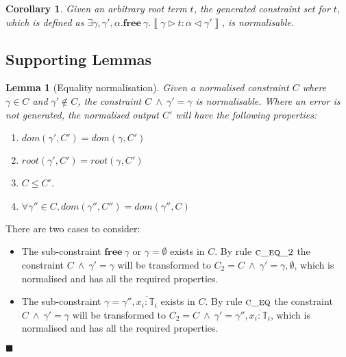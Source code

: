 \documentclass[preprint]{sigplanconf}
\newtheorem{lem}{Lemma}
\newtheorem{cor}{Corollary}
\newcommand{\inferlhs}[1]{\left\llbracket \gamma \triangleright #1 : \alpha \triangleleft \gamma' \right\rrbracket}
\newcommand{\cand}{\:\wedge\:}
\newcommand{\free}[1]{\mathbf{free}\:#1}
\newcommand{\tinf}{\mathbb{T}}
\newcommand{\qed}{$\blacksquare$}
\newenvironment{proof}{\vspace{1ex}\noindent{\bf Proof}\hspace{0.5em}}
  {\hfill\qed\vspace{1ex}}
\begin{document}
\begin{cor}
Given an arbitrary root term $t$, the generated constraint set for $t$,
which is defined as
$\exists \gamma, \gamma', \alpha . \free{\gamma} . \inferlhs{t}$,
is normalisable.
\end{cor}

\subsection{Supporting Lemmas}

\begin{lem}[Equality normalisation]
\label{lem:norm_eq}
Given a normalised constraint $C$ where $\gamma \in C$ and $\gamma' \notin C$, 
the constraint $C \cand \gamma' = \gamma$ is normalisable. Where an
error is not generated, the normalised output $C'$ will have the following
properties:

\begin{enumerate}
\item $dom(\gamma', C') = dom(\gamma, C')$
\item $root(\gamma', C') = root(\gamma, C')$
\item $C \leq C'$.
\item $\forall \gamma'' \in C, dom(\gamma'', C'') = dom(\gamma'', C)$
\end{enumerate}

\end{lem}
\begin{proof}
There are two cases to consider:

\begin{itemize}
\item The sub-constraint $\free{\gamma}$ or $\gamma = \emptyset$ exists
in $C$. By rule $\textsc{c\_eq\_2}$ the constraint $C \cand \gamma' = \gamma$
will be transformed to $C_2 = C \cand \gamma' = \gamma, \emptyset$, which is
normalised and has all the required properties.

\item The sub-constraint $\gamma = \gamma'', \overline{x_i : \tinf_i}$ exists
in $C$. By rule $\textsc{c\_eq}$ the constraint $C \cand \gamma' = \gamma$
will be transformed to 
$C_2 = C \cand \gamma' = \gamma'', \overline{x_i : \tinf_i}$,
which is normalised and has all the required properties.
\end{itemize}
\end{proof}
\end{document}
